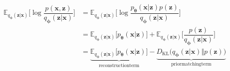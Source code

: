 \documentclass[14pt, a4paper]{article}
\numberwithin{equation}{section}
\numberwithin{figure}{section}
\numberwithin{dl}{section}
\numberwithin{md}{section}
\numberwithin{bd}{section}
\numberwithin{dn}{section}
\numberwithin{hq}{section}
\begin{document}
    \begin{equation}
        \begin{aligned}
            \mathbb{E}_{q_{\boldsymbol{\phi}} (\boldsymbol{z} \vert \boldsymbol{x})} \Bigg \lbrack \log \dfrac{p(\boldsymbol{x}, \boldsymbol{z})}{q_{\boldsymbol{\phi}} (\boldsymbol{z} \vert \boldsymbol{x})} \Bigg \rbrack &= \mathbb{E}_{q_{\boldsymbol{\phi}} (\boldsymbol{z} \vert \boldsymbol{x})} \Bigg \lbrack \log \dfrac{p_{\boldsymbol{\theta}}(\boldsymbol{x} \vert \boldsymbol{z}) p (\boldsymbol{z})}{q_{\boldsymbol{\phi}} (\boldsymbol{z} \vert \boldsymbol{x})} \Bigg \rbrack \\
            &= \mathbb{E}_{q_{\boldsymbol{\phi}} (\boldsymbol{z} \vert \boldsymbol{x})} \lbrack p_{\boldsymbol{\theta}} (\boldsymbol{x} \vert \boldsymbol{z}) \rbrack + \mathbb{E}_{q_{\boldsymbol{\phi}} (\boldsymbol{z} \vert \boldsymbol{x})} \Bigg \lbrack \dfrac{p(\boldsymbol{z})}{q_{\boldsymbol{\phi}} (\boldsymbol{z} \vert \boldsymbol{x})} \Bigg \rbrack \\
            &= \underbrace{\mathbb{E}_{q_{\boldsymbol{\phi}} (\boldsymbol{z} \vert \boldsymbol{x})} \lbrack p_{\boldsymbol{\theta}} (\boldsymbol{x} \vert \boldsymbol{z}) \rbrack}_{\mathrm{reconstruction term}} - \underbrace{D_{\mathrm{KL}} \big( q_{\boldsymbol{\phi}} (\boldsymbol{z} \vert \boldsymbol{x}) \Vert p(\boldsymbol{z}) \big)}_{\mathrm{prior matching term}}
        \end{aligned}
    \end{equation}
\end{document}
